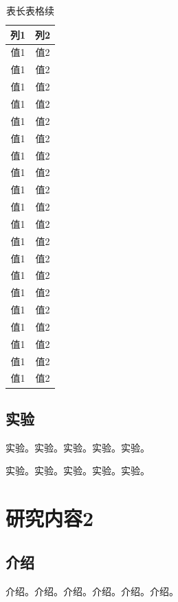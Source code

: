 \documentclass{csuthesis}
\begin{document}
    \begin{table}[!t]
        \centering
        \caption*{表\thetable \quad 长表格续}
        \begin{tabular}{c c}
            \toprule[1.5bp]
            列1 & 列2 \\
            \midrule[0.75bp]
            值1 & 值2 \\
            值1 & 值2 \\
            值1 & 值2 \\
            值1 & 值2 \\
            值1 & 值2 \\
            值1 & 值2 \\
            值1 & 值2 \\
            值1 & 值2 \\
            值1 & 值2 \\
            值1 & 值2 \\
            值1 & 值2 \\
            值1 & 值2 \\
            值1 & 值2 \\
            值1 & 值2 \\
            值1 & 值2 \\
            值1 & 值2 \\
            值1 & 值2 \\
            值1 & 值2 \\
            值1 & 值2 \\
            值1 & 值2 \\
            \bottomrule[1.5bp]
        \end{tabular}
    \end{table}

    \clearpage %

    \section{实验}
    实验。实验。实验。实验。实验。

    实验。实验。实验。实验。实验。
    
    \chapter{研究内容2}
    \thispagestyle{mainstyle} %
    \section{介绍}
    介绍。介绍。介绍。介绍。介绍。介绍。
\end{document}
